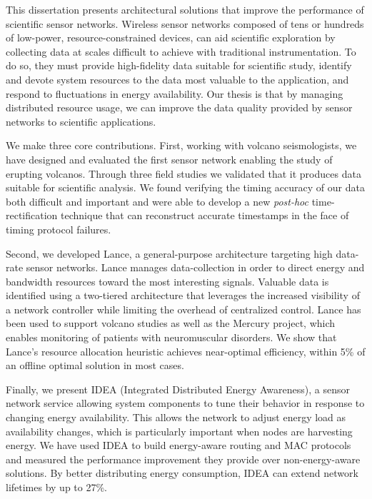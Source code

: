 \hspace{0.25in}

This dissertation presents architectural solutions that improve the
performance of scientific sensor networks. Wireless sensor networks composed
of tens or hundreds of low-power, resource-constrained devices, can aid
scientific exploration by collecting data at scales difficult to achieve with
traditional instrumentation. To do so, they must provide high-fidelity data
suitable for scientific study, identify and devote system resources to the
data most valuable to the application, and respond to fluctuations in energy
availability. Our thesis is that by managing distributed resource usage, we
can improve the data quality provided by sensor networks to scientific
applications.

We make three core contributions. First, working with volcano seismologists,
we have designed and evaluated the first sensor network enabling the study of
erupting volcanos. Through three field studies we validated that it produces
data suitable for scientific analysis. We found verifying the timing accuracy
of our data both difficult and important and were able to develop a new
\textit{post-hoc} time-rectification technique that can reconstruct accurate
timestamps in the face of timing protocol failures.

Second, we developed Lance, a general-purpose architecture targeting high
data-rate sensor networks. Lance manages data-collection in order to direct
energy and bandwidth resources toward the most interesting signals. Valuable
data is identified using a two-tiered architecture that leverages the
increased visibility of a network controller while limiting the overhead of
centralized control. Lance has been used to support volcano studies as well
as the Mercury project, which enables monitoring of patients with
neuromuscular disorders. We show that Lance's resource allocation heuristic
achieves near-optimal efficiency, within 5\% of an offline optimal solution
in most cases.

Finally, we present IDEA (Integrated Distributed Energy Awareness), a sensor
network service allowing system components to tune their behavior in response
to changing energy availability. This allows the network to adjust energy
load as availability changes, which is particularly important when nodes are
harvesting energy. We have used IDEA to build energy-aware routing and MAC
protocols and measured the performance improvement they provide over
non-energy-aware solutions. By better distributing energy consumption, IDEA
can extend network lifetimes by up to 27\%.

